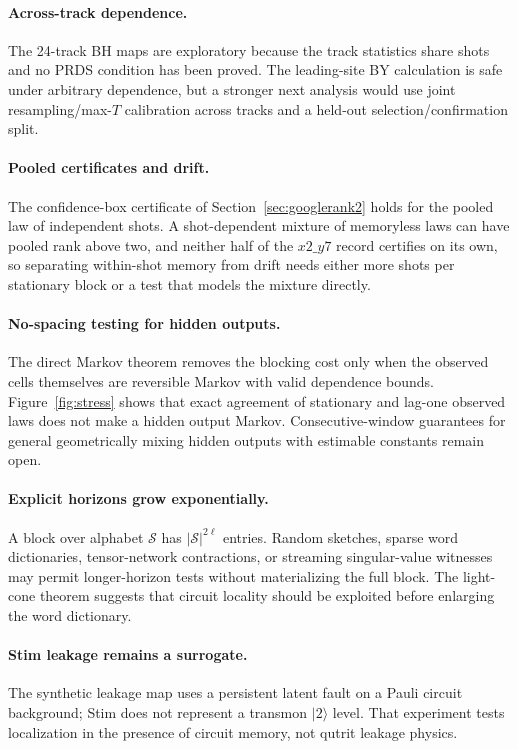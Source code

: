 \documentclass[11pt]{article}
\newcommand{\cS}{\mathcal{S}}
\begin{document}
\paragraph{Across-track dependence.}
The 24-track BH maps are exploratory because the track statistics share shots and no PRDS condition has been proved. The leading-site BY calculation is safe under arbitrary dependence, but a stronger next analysis would use joint resampling/max-$T$ calibration across tracks and a held-out selection/confirmation split.

\paragraph{Pooled certificates and drift.}
The confidence-box certificate of Section~\ref{sec:googlerank2} holds for the pooled law of independent shots. A shot-dependent mixture of memoryless laws can have pooled rank above two, and neither half of the $x2\_y7$ record certifies on its own, so separating within-shot memory from drift needs either more shots per stationary block or a test that models the mixture directly.

\paragraph{No-spacing testing for hidden outputs.}
The direct Markov theorem removes the blocking cost only when the observed cells themselves are reversible Markov with valid dependence bounds. Figure~\ref{fig:stress} shows that exact agreement of stationary and lag-one observed laws does not make a hidden output Markov. Consecutive-window guarantees for general geometrically mixing hidden outputs with estimable constants remain open.

\paragraph{Explicit horizons grow exponentially.}
A block over alphabet $\cS$ has $|\cS|^{2\ell}$ entries. Random sketches, sparse word dictionaries, tensor-network contractions, or streaming singular-value witnesses may permit longer-horizon tests without materializing the full block. The light-cone theorem suggests that circuit locality should be exploited before enlarging the word dictionary.

\paragraph{Stim leakage remains a surrogate.}
The synthetic leakage map uses a persistent latent fault on a Pauli circuit background; Stim does not represent a transmon $|2\rangle$ level. That experiment tests localization in the presence of circuit memory, not qutrit leakage physics.
\end{document}
